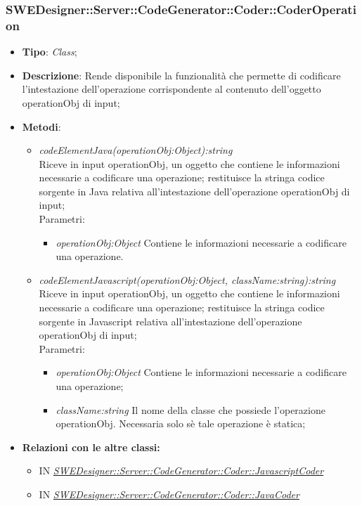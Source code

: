 \documentclass[../DefinizioneDiProdotto.tex]{subfiles}
\begin{document}
			\subsubsection{SWEDesigner::Server::CodeGenerator::Coder::CoderOperation}
			\hypertarget{SWEDesigner::Server::CodeGenerator::Coder::CoderOperation}{}
			\begin{itemize}
				\item \textbf{Tipo}: \emph{Class};
				\item \textbf{Descrizione}: Rende disponibile la funzionalità che permette di codificare l'intestazione dell'operazione corrispondente al contenuto dell'oggetto operationObj di input; \\
				\item \textbf{Metodi}:
				\begin{itemize}
					\item \emph{codeElementJava(operationObj:Object):string} \\ 
					Riceve in input operationObj, un oggetto che contiene le informazioni necessarie a codificare una operazione; 
					restituisce la stringa codice sorgente in Java relativa all'intestazione dell'operazione operationObj di input; \\
					Parametri:
					\begin{itemize}
						\item \emph{operationObj:Object} Contiene le informazioni necessarie a codificare una operazione.
					\end{itemize}
					
					
					
					\item \emph{codeElementJavascript(operationObj:Object, className:string):string} \\ 
					Riceve in input operationObj, un oggetto che contiene le informazioni necessarie a codificare una operazione; 
					restituisce la stringa codice sorgente in Javascript relativa all'intestazione dell'operazione operationObj di input; \\
					Parametri:
					\begin{itemize}
						\item \emph{operationObj:Object} Contiene le informazioni necessarie a codificare una operazione;
						\item \emph{className:string} Il nome della classe che possiede l'operazione operationObj. Necessaria solo sè tale operazione è statica;
					\end{itemize}
				\end{itemize}
				
				\item \textbf{Relazioni con le altre classi:}
				\begin{itemize}
					\item IN \hyperlink{SWEDesigner::Server::CodeGenerator::Coder::JavascriptCoder}{\emph{SWEDesigner::Server::CodeGenerator::Coder::JavascriptCoder}}
					\item IN \hyperlink{SWEDesigner::Server::CodeGenerator::Coder::JavaCoder}{\emph{SWEDesigner::Server::CodeGenerator::Coder::JavaCoder}}
				\end{itemize}	
			\end{itemize}
			
\end{document}
